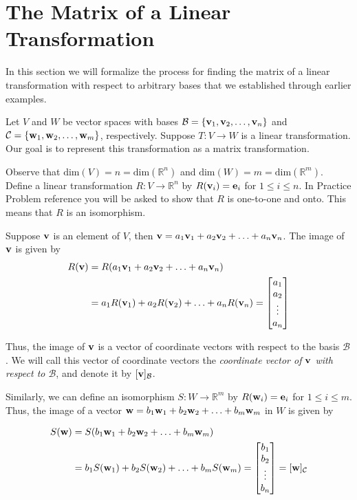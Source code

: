 \documentclass{ximera}
\renewcommand{\vec}[1]{{\bf #1}}
\newcommand{\RR}{\mathbb{R}}
\newcommand{\dfn}{\textit}
\begin{document}
\section{The Matrix of a Linear Transformation}
In this section we will formalize the process for finding the matrix of a linear transformation with respect to arbitrary bases that we established through earlier examples.

Let $V$ and $W$ be vector spaces with bases $\mathcal{B}=\{\vec{v}_1, \vec{v}_2,\ldots ,\vec{v}_n\}$ and $\mathcal{C}=\{\vec{w}_1, \vec{w}_2,\ldots ,\vec{w}_m\}$, respectively.   Suppose $T:V\rightarrow W$ is a linear transformation.  Our goal is to represent this transformation as a matrix transformation.

Observe that $\text{dim}(V)=n=\text{dim}(\RR^n)$ and $\text{dim}(W)=m=\text{dim}(\RR^m)$. Define a linear transformation $R:V\rightarrow \RR^n$ by $R(\vec{v}_i)=\vec{e}_i$ for $1\leq i\leq n$.  In Practice Problem {\color{red} reference} you will be asked to show that $R$ is one-to-one and onto.  This means that $R$ is an isomorphism.  

Suppose $\vec{v}$ is an element of $V$, then $\vec{v}=a_1\vec{v}_1+a_2\vec{v}_2+\ldots +a_n\vec{v}_n$.  The image of $\vec{v}$ is given by
\begin{align*}
R(\vec{v})&=R(a_1\vec{v}_1+a_2\vec{v}_2+\ldots +a_n\vec{v}_n)\\&=a_1R(\vec{v}_1)+a_2R(\vec{v}_2)+\ldots +a_nR(\vec{v}_n)=\begin{bmatrix}a_1\\a_2\\\vdots\\a_n\end{bmatrix}
\end{align*}

Thus, the image of $\vec{v}$ is a vector of coordinate vectors with respect to the basis $\mathcal{B}$.  We will call this vector of coordinate vectors the \dfn{coordinate vector of $\vec{v}$ with respect to $\mathcal{B}$}, and denote it by $[\vec{v}]_{\mathcal{B}}$.

Similarly, we can define an isomorphism $S:W\rightarrow \RR^m$ by $R(\vec{w}_i)=\vec{e}_i$ for $1\leq i\leq m$. Thus, the image of a vector $\vec{w}=b_1\vec{w}_1+b_2\vec{w}_2+\ldots +b_m\vec{w}_m$ in $W$ is given by

\begin{align*}
S(\vec{w})&=S(b_1\vec{w}_1+b_2\vec{w}_2+\ldots +b_m\vec{w}_m)\\&=b_1S(\vec{w}_1)+b_2S(\vec{w}_2)+\ldots +b_mS(\vec{w}_m)=\begin{bmatrix}b_1\\b_2\\\vdots\\b_n\end{bmatrix}=[\vec{w}]_{\mathcal{C}}
\end{align*}
\end{document}
